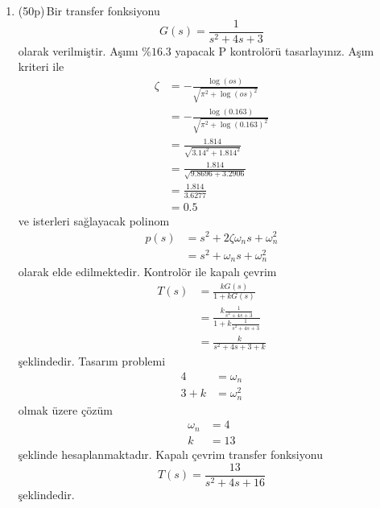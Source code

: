 \begin{enumerate}[\bfseries S1.]
    \item (50p)\,Bir transfer fonksiyonu
    \begin{equation}
        G(s)=\frac{1}{s^2+4s+3}
    \end{equation}
    olarak verilmiştir. Aşımı $\%16.3$ yapacak P kontrolörü tasarlayınız. Aşım kriteri ile
    \begin{equation}
    \begin{split}
        \zeta&=-\frac{\log(os)}{\sqrt{\pi^2+\log(os)^2}}\\
        &=-\frac{\log(0.163)}{\sqrt{\pi^2+\log(0.163)^2}}\\
        &=\frac{1.814}{\sqrt{3.14^2+1.814^2}}\\
        &=\frac{1.814}{\sqrt{9.8696+3.2906}}\\
        &=\frac{1.814}{3.6277}\\
        &=0.5
    \end{split}
    \end{equation}
    ve isterleri sağlayacak polinom
    \begin{equation}
    \begin{split}
        p(s)&=s^2+2\zeta \omega_n s+\omega_n^2\\
        &=s^2+\omega_n s+\omega_n^2
    \end{split}
    \end{equation}
    olarak elde edilmektedir. Kontrolör ile kapalı çevrim
    \begin{equation}
    \begin{split}
        T(s)&=\frac{kG(s)}{1+kG(s)}\\
        &=\frac{k\frac{1}{s^2+4s+3}}{1+k\frac{1}{s^2+4s+3}}\\
        &=\frac{k}{s^2+4s+3+k}
    \end{split}
    \end{equation}
    şeklindedir. Tasarım problemi 
    \begin{equation}
    \begin{split}
        4&=\omega_n\\
        3+k&=\omega_n^2
    \end{split}
    \end{equation}
    olmak üzere çözüm 
    \begin{equation}
    \begin{split}
        \omega_n&=4\\
        k&=13
    \end{split}
    \end{equation}
    şeklinde hesaplanmaktadır. Kapalı çevrim transfer fonksiyonu 
    \begin{equation}
    T(s)=\frac{13}{s^2 + 4 s + 16}
    \end{equation}
    şeklindedir.


\end{enumerate}
